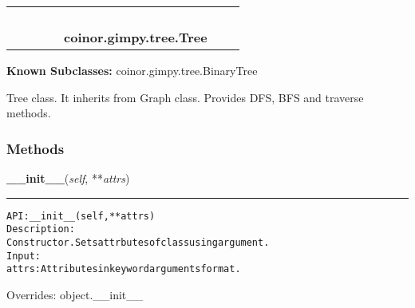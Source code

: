     \label{coinor:gimpy:tree:Tree}
\begin{tabular}{cccccccc}
\multicolumn{2}{r}{\settowidth{\BCL}{object}\multirow{2}{\BCL}{object}}
&&
&&
  \\\cline{3-3}
  &&\multicolumn{1}{c|}{}
&&
&&
  \\
\multicolumn{4}{r}{\settowidth{\BCL}{coinor.gimpy.graph.Graph}\multirow{2}{\BCL}{coinor.gimpy.graph.Graph}}
&&
  \\\cline{5-5}
  &&&&\multicolumn{1}{c|}{}
&&
  \\
&&&&\multicolumn{2}{l}{\textbf{coinor.gimpy.tree.Tree}}
\end{tabular}

\textbf{Known Subclasses:} coinor.gimpy.tree.BinaryTree

Tree class. It inherits from Graph class. Provides DFS, BFS and traverse 
methods.



  \subsubsection{Methods}

    \vspace{0.5ex}

\hspace{.8\funcindent}\begin{boxedminipage}{\funcwidth}

    \raggedright \textbf{\_\_init\_\_}(\textit{self}, **\textit{attrs})

    \vspace{-1.5ex}

    \rule{\textwidth}{0.5\fboxrule}
\setlength{\parskip}{2ex}
\begin{alltt}

API: \_\_init\_\_(self, **attrs)
Description:
    Constructor. Sets attrbutes of class using argument.
Input:
    attrs: Attributes in keyword arguments format.
\end{alltt}

\setlength{\parskip}{1ex}
      Overrides: object.\_\_init\_\_

    \end{boxedminipage}

